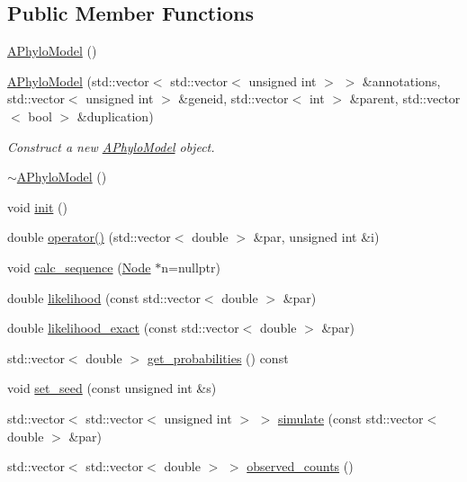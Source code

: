 \subsection*{Public Member Functions}
\begin{DoxyCompactItemize}
\item 
\hyperlink{class_a_phylo_model_a5055699d05235bbefb283298d9dee75d}{A\+Phylo\+Model} ()
\item 
\hyperlink{class_a_phylo_model_a4c0005c106a12f1b11ccd9f5ceac8d9c}{A\+Phylo\+Model} (std\+::vector$<$ std\+::vector$<$ unsigned int $>$ $>$ \&annotations, std\+::vector$<$ unsigned int $>$ \&geneid, std\+::vector$<$ int $>$ \&parent, std\+::vector$<$ bool $>$ \&duplication)
\begin{DoxyCompactList}\small\item\em Construct a new \hyperlink{class_a_phylo_model}{A\+Phylo\+Model} object. \end{DoxyCompactList}\item 
\hyperlink{class_a_phylo_model_ab8b8523e07df92859e5d4289341da72f}{$\sim$\+A\+Phylo\+Model} ()
\item 
void \hyperlink{class_a_phylo_model_a45a7af583f9619bce5d88b15303a73e6}{init} ()
\item 
double \hyperlink{class_a_phylo_model_a9b3390c29ea7a3283e68e9a059b94138}{operator()} (std\+::vector$<$ double $>$ \&par, unsigned int \&i)
\item 
void \hyperlink{class_a_phylo_model_a4a06f02ecd5da1e1b5609fec24318282}{calc\+\_\+sequence} (\hyperlink{class_node}{Node} $\ast$n=nullptr)
\item 
double \hyperlink{class_a_phylo_model_a66fced3b89fe385862318621855fa605}{likelihood} (const std\+::vector$<$ double $>$ \&par)
\item 
double \hyperlink{class_a_phylo_model_a22e8844816076c6f13d0371b1b62a22a}{likelihood\+\_\+exact} (const std\+::vector$<$ double $>$ \&par)
\item 
std\+::vector$<$ double $>$ \hyperlink{class_a_phylo_model_a3368d03919454f68f0cb5bd888f983a1}{get\+\_\+probabilities} () const
\item 
void \hyperlink{class_a_phylo_model_a5f3faed4bad372764c056d1686508d6e}{set\+\_\+seed} (const unsigned int \&s)
\item 
std\+::vector$<$ std\+::vector$<$ unsigned int $>$ $>$ \hyperlink{class_a_phylo_model_ac75bb5a2f14d104733e2c194ae210986}{simulate} (const std\+::vector$<$ double $>$ \&par)
\item 
std\+::vector$<$ std\+::vector$<$ double $>$ $>$ \hyperlink{class_a_phylo_model_ac101dec16afb5d1c957fa1ccdca45c63}{observed\+\_\+counts} ()

\end{DoxyCompactItemize}
